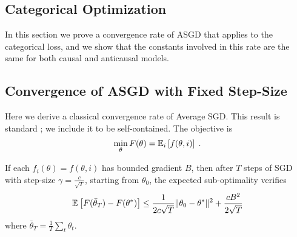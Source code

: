 \begin{subappendices}

\newcommand{\tet}{\theta_t}
\newcommand{\ttt}{\theta_{t+1}}
\newcommand{\ts}{\theta^{*}}

\onecolumn

\section{{Categorical Optimization}}

In this section we prove a convergence rate of ASGD that applies to the categorical loss, and we show that the constants involved in this rate are the same for both causal and anticausal models.

\subsection{Convergence of ASGD with Fixed Step-Size}
\label{apdx:asgd_rate}
Here we derive a classical convergence rate of Average SGD.
This result is standard ; we include it to be self-contained.
The objective is 
\begin{align}
\min_{\theta} F(\theta) = \expect[i]{f(\theta,i)} \; .
\end{align}

\begin{theorem}
If each $f_i(\theta) = f(\theta,i)$ has bounded gradient $B$,
then after $T$ steps of SGD with step-size $\gamma=\frac{c}{\sqrt{T}}$,
starting from $\theta_0$,
the expected sub-optimality verifies
\begin{align}
   \expect{F(\bar{\theta}_T) - F(\ts)} \leq \frac{1}{2c\sqrt{T}}\|\theta_0- \ts\|^2 + \frac{ c B^2}{2\sqrt{T}}
\end{align}
where $\bar{\theta}_T = \frac{1}{T} \sum_t \tet$.
\end{theorem}


\end{subappendices}
